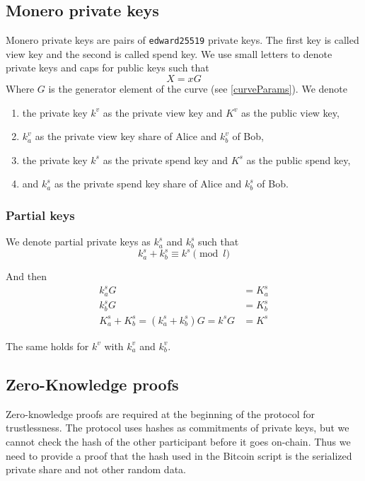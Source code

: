 \documentclass{llncs}
\begin{document}
\subsection{Monero private keys}
Monero private keys are pairs of \texttt{edward25519} private keys. The first key is called view key and the second is called spend key. We use small letters to denote private keys and caps for public keys such that
$$X = xG$$
Where $G$ is the generator element of the curve (see \ref{curveParams}). We denote
\begin{enumerate}[label=(\roman*)]
    \item the private key $k^v$ as the private view key and $K^v$ as the public view key,
    \item $k^v_a$ as the private view key share of Alice and $k^v_b$ of Bob,
    \item the private key $k^s$ as the private spend key and $K^s$ as the public spend key,
    \item and $k^s_a$ as the private spend key share of Alice and $k^s_b$ of Bob.
\end{enumerate}

\subsubsection{Partial keys}
We denote partial private keys as $k^s_a$ and $k^s_b$ such that
$$k^s_a + k^s_b \equiv k^s \pmod l$$

And then
\begin{equation}
\begin{split}
    k^s_aG &= K^s_a \\
    k^s_bG &= K^s_b \\
    K^s_a + K^s_b = (k^s_a + k^s_b)G = k^sG &= K^s
\end{split}
\end{equation}

The same holds for $k^v$ with $k^v_a$ and $k^v_b$.

\subsection{Zero-Knowledge proofs}
Zero-knowledge proofs are required at the beginning of the protocol for trustlessness. The protocol uses hashes as commitments of private keys, but we cannot check the hash of the other participant before it goes on-chain. Thus we need to provide a proof that the hash used in the Bitcoin script is the serialized private share and not other random data.
\end{document}
